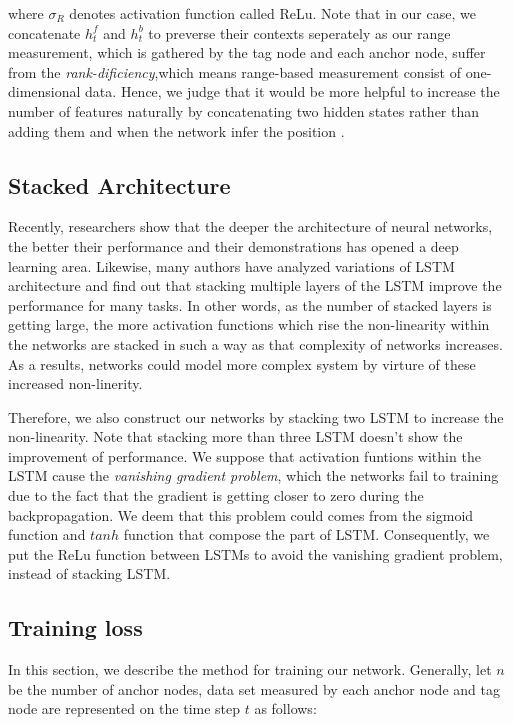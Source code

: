 \documentclass[letterpaper, 10 pt, conference]{ieeeconf}  %
\begin{document}
where $\sigma _{R}$ denotes activation function called ReLu. Note that in our case, we concatenate $h^{f}_{t}$ and $h^{b}_{t}$ to preverse their contexts seperately as our range measurement, which is gathered by the tag node and each anchor node, suffer from the \textit{rank-dificiency},which means range-based measurement consist of one-dimensional data\cite{fabresse2013undelayed}. Hence, we judge that it would be more helpful to increase the number of features naturally by concatenating two hidden states rather than adding them and when the network infer the position  .

\subsection{Stacked Architecture}

Recently, researchers show that the deeper the architecture of neural networks, the better their performance\cite{simonyan2014very, he2016deep} and their demonstrations has opened a deep learning area. Likewise, many authors have analyzed variations of LSTM architecture and find out that stacking multiple layers of the LSTM improve the performance for many tasks\cite{graves2013hybrid, graves2013speech,ullah2018action}. In other words, as the number of stacked layers is getting large, the more activation functions which rise the non-linearity within the networks are stacked  in such a way as that complexity of networks increases. As a results, networks could model more complex system by virture of these increased non-linerity.

Therefore, we also construct our networks by stacking two LSTM to increase the non-linearity. Note that stacking more than three LSTM doesn't show the improvement of performance. We suppose that activation funtions within the LSTM cause the \textit{vanishing gradient problem}\cite{pascanu2013difficulty}, which the networks fail to training due to the fact that the gradient is getting closer to zero during the backpropagation. We deem that this problem could comes from the sigmoid function and $tanh$ function that compose the part of LSTM. Consequently, we put the ReLu function between LSTMs to avoid the vanishing gradient problem\cite{nair2010rectified}, instead of stacking LSTM.    


\subsection{Training loss}

In this section, we describe the method for training our network. Generally, let $n$ be the number of anchor nodes, data set measured by each anchor node and tag node are represented on the time step $t$ as follows:
\end{document}
